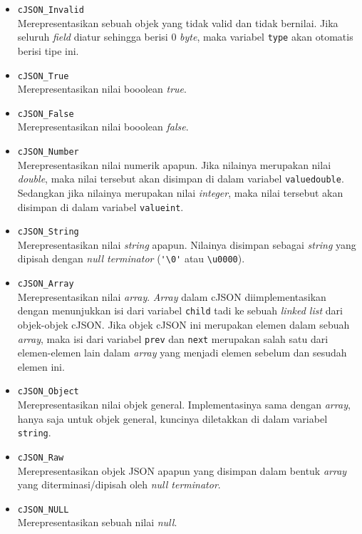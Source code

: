\documentclass[a4paper,twoside]{article}
\begin{document}
\begin{enumerate}
\begin{itemize}
	\begin{itemize}
		\item \verb|cJSON_Invalid|\\
		Merepresentasikan sebuah objek yang tidak valid dan tidak bernilai. Jika seluruh \textit{field} diatur sehingga berisi 0 \textit{byte}, maka variabel \verb|type| akan otomatis berisi tipe ini.
		\item \verb|cJSON_True|\\
		Merepresentasikan nilai booolean \textit{true}.
		\item \verb|cJSON_False|\\
		Merepresentasikan nilai booolean \textit{false}.
		\item \verb|cJSON_Number|\\
		Merepresentasikan nilai numerik apapun. Jika nilainya merupakan nilai \textit{double}, maka nilai tersebut akan disimpan di dalam variabel \verb|valuedouble|. Sedangkan jika nilainya merupakan nilai \textit{integer}, maka nilai tersebut akan disimpan di dalam variabel \verb|valueint|.
		\item \verb|cJSON_String|\\
		Merepresentasikan nilai \textit{string} apapun. Nilainya disimpan sebagai \textit{string} yang dipisah dengan \textit{null terminator} (\verb|'\0'| atau \verb|\u0000|).
		\item \verb|cJSON_Array|\\
		Merepresentasikan nilai \textit{array}. \textit{Array} dalam cJSON diimplementasikan dengan menunjukkan isi dari variabel \verb|child| tadi ke sebuah \textit{linked list} dari objek-objek cJSON. Jika objek cJSON ini merupakan elemen dalam sebuah \textit{array}, maka isi dari variabel \verb|prev| dan \verb|next| merupakan salah satu dari elemen-elemen lain dalam \textit{array} yang menjadi elemen sebelum dan sesudah elemen ini.
		\item \verb|cJSON_Object|\\
		Merepresentasikan nilai objek general. Implementasinya sama dengan \textit{array}, hanya saja untuk objek general, kuncinya diletakkan di dalam variabel \verb|string|.
		\item \verb|cJSON_Raw|\\
		Merepresentasikan objek JSON apapun yang disimpan dalam bentuk \textit{array} yang diterminasi/dipisah oleh \textit{null terminator}.
		\item \verb|cJSON_NULL|\\
		Merepresentasikan sebuah nilai \textit{null}.
	\end{itemize}
	

\end{itemize}
\end{enumerate}
\end{document}
